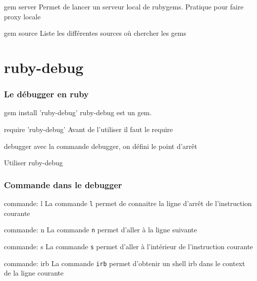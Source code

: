 \documentclass{beamer}
\begin{document}
\begin{frame}
  \begin{block}{gem server}
    Permet de lancer un serveur local de rubygems. Pratique pour faire proxy locale
  \end{block}
  \begin{block}{gem source}
    Liste les diff\'erentes sources où chercher les gems
  \end{block}
\end{frame}


\section{ruby-debug}

\begin{frame}
  \frametitle{Le d\'ebugger en ruby}
  \begin{block}{gem install 'ruby-debug'}
    ruby-debug est un gem.
  \end{block}
  \begin{block}{require 'ruby-debug'}
    Avant de l'utiliser il faut le require
  \end{block}
  \begin{block}{debugger}
    avec la commande debugger, on d\'efini le point d'arrêt
  \end{block}
\end{frame}

\begin{frame}
  \begin{beamerboxesrounded}{Utiliser ruby-debug}
    
  \end{beamerboxesrounded}
\end{frame}

\begin{frame}
  \frametitle{Commande dans le debugger}
  \begin{block}{commande: l}
    La commande \verb?l? permet de connaitre la ligne d'arrêt de l'instruction courante
  \end{block}
  \begin{block}{commande: n}
    La commande \verb?n? permet d'aller à la ligne suivante
  \end{block}
  \begin{block}{commande: s}
    La commande \verb?s? permet d'aller à l'int\'erieur de l'instruction courante
  \end{block}
  \begin{block}{commande: irb}
    La commande \verb?irb? permet d'obtenir un shell irb dans le context de la ligne courante
  \end{block}
\end{frame}
\end{document}
